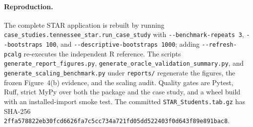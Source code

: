 \documentclass[11pt,a4paper]{article}
\newcommand{\code}[1]{\texttt{#1}}
\newcommand{\brk}{\discretionary{}{}{}}
\begin{document}
\paragraph{Reproduction.} The complete STAR application is rebuilt by running
\code{case\_studies.\brk tennessee\_star.\brk run\_case\_study} with
\code{-{}-benchmark-repeats 3}, \code{-{}-bootstraps 100}, and
\code{-{}-descriptive-\brk bootstraps 1000}; adding
\code{-{}-refresh-pcalg} re-executes the independent R reference. The scripts
\code{generate\_\brk report\_\brk figures.py},
\code{generate\_\brk oracle\_\brk validation\_\brk summary.py}, and
\code{generate\_\brk scaling\_\brk benchmark.py} under \code{reports/}
regenerate the figures, the frozen
Figure~4(b) evidence, and the scaling audit. Quality gates are Pytest, Ruff,
strict MyPy over both the package and the case study, and a wheel build with
an installed-import smoke test. The committed \code{STAR\_Students.tab.gz} has
SHA-256
\code{2ffa578822eb30fcd6626fa7c5cc734a\brk 721fd05dd522403f0d643f89e891bac8}.
\end{document}
